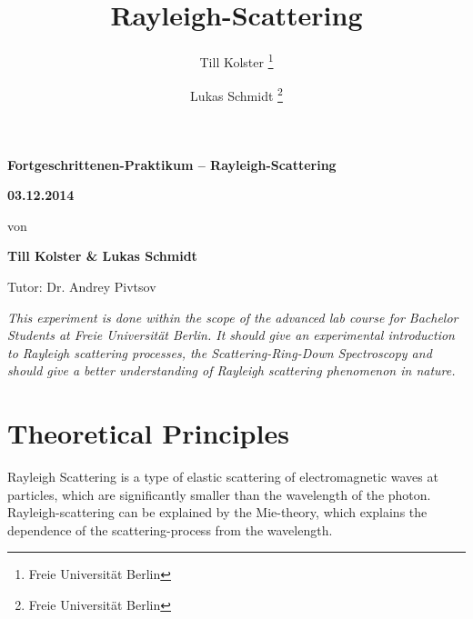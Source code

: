 \documentclass[
	parskip=half,10pt,
	numbers= noenddot, %
	toc=flat, %
	oneside,
	twocolumn,
	]{scrartcl}
\title {Rayleigh-Scattering}
\author {Till Kolster \thanks{Freie Universität Berlin} \and Lukas Schmidt \thanks{Freie Universität Berlin}}
\begin{document}
\begin{titlepage}

\vspace*{-2cm}

\vspace{6cm}
\begin{center}
\huge \bfseries
Fortgeschrittenen-Praktikum -- Rayleigh-Scattering

\vspace{0.5cm}
\large \bfseries
03.12.2014

\vspace{1.5cm}

\large\normalfont von

\bigskip
\textbf{Till Kolster \& Lukas Schmidt}

\bigskip
Tutor: Dr. Andrey Pivtsov

\vspace{3cm}

\parbox{0.8\linewidth}{%
\textit{This experiment is done within the scope of the advanced lab course for Bachelor Students at Freie Universität Berlin.
It should give an experimental introduction to Rayleigh scattering processes, the Scattering-Ring-Down Spectroscopy and should
give a better understanding of Rayleigh scattering phenomenon in nature.
}}


\end{center}
\end{titlepage}


\section{Theoretical Principles}

Rayleigh Scattering is a type of elastic scattering of electromagnetic waves at particles, which are significantly smaller than the wavelength of the photon. 
Rayleigh-scattering can be explained by the Mie-theory, which explains the dependence of the scattering-process from the wavelength. 
\end{document}

